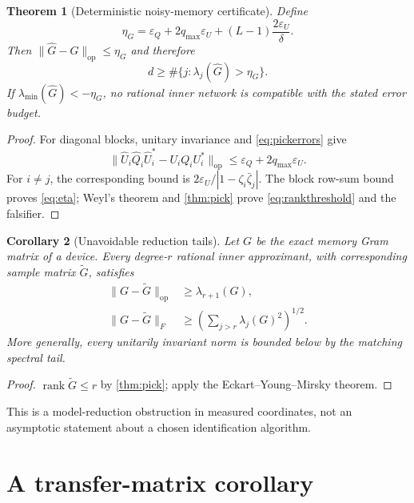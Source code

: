 \documentclass[11pt]{article}
\newtheorem{theorem}{Theorem}[section]
\newtheorem{corollary}[theorem]{Corollary}
\theoremstyle{definition}
\theoremstyle{remark}
\newcommand{\rank}{\operatorname{rank}}
\newcommand{\opnorm}[1]{\lVert#1\rVert_{\mathrm{op}}}
\begin{document}
\begin{theorem}[Deterministic noisy-memory certificate]\label{thm:robustpick}
Define
\begin{equation}\label{eq:eta}
 \eta_G=\varepsilon_Q+2q_{\max}\varepsilon_U
 +(L-1)\frac{2\varepsilon_U}{\delta}.
\end{equation}
Then $\opnorm{\widehat G-G}\leq\eta_G$ and therefore
\begin{equation}\label{eq:rankthreshold}
 \boxed{\qquad
 d\geq\#\{j:\lambda_j(\widehat G)>\eta_G\}.
 \qquad}
\end{equation}
If $\lambda_{\min}(\widehat G)<-\eta_G$, no rational inner network is
compatible with the stated error budget.
\end{theorem}

\begin{proof}
For diagonal blocks, unitary invariance and \eqref{eq:pickerrors} give
\[
 \opnorm{\widehat U_i\widehat Q_i\widehat U_i^*-U_iQ_iU_i^*}
 \leq\varepsilon_Q+2q_{\max}\varepsilon_U.
\]
For $i\ne j$, the corresponding bound is
$2\varepsilon_U/|1-\zeta_i\bar\zeta_j|$.
The block row-sum bound proves \eqref{eq:eta}; Weyl's theorem and
\cref{thm:pick} prove \eqref{eq:rankthreshold} and the falsifier.
\end{proof}

\begin{corollary}[Unavoidable reduction tails]\label{cor:reduction}
Let $G$ be the exact memory Gram matrix of a device.  Every degree-$r$
rational inner approximant, with corresponding sample matrix $\widetilde G$,
satisfies
\begin{align}
 \opnorm{G-\widetilde G}&\geq\lambda_{r+1}(G),\label{eq:opertail}\\
 \lVert G-\widetilde G\rVert_F
 &\geq\left(\sum_{j>r}\lambda_j(G)^2\right)^{1/2}.
 \label{eq:frobtail}
\end{align}
More generally, every unitarily invariant norm is bounded below by the
matching spectral tail.
\end{corollary}

\begin{proof}
$\rank\widetilde G\leq r$ by \cref{thm:pick}; apply the
Eckart--Young--Mirsky theorem.
\end{proof}

This is a model-reduction obstruction in measured coordinates, not an
asymptotic statement about a chosen identification algorithm.

\section{A transfer-matrix corollary}
\end{document}
